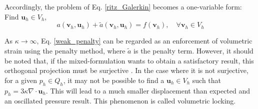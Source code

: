 Accordingly, the problem of Eq. \eqref{ritz_Galerkin} becomes a one-variable form:
Find $\boldsymbol{u}_h \in V_h$,
\begin{equation}\label{weak_penalty}
a(\boldsymbol{v}_h, \boldsymbol{u}_h) + \tilde{a}(\boldsymbol{v}_h, \boldsymbol{u}_h) = f(\boldsymbol{v}_h), \quad \forall \boldsymbol{v}_h \in V_h
\end{equation}

As $\kappa \rightarrow \infty$, Eq. \eqref{weak_penalty} can be regarded as an enforcement of volumetric strain using the penalty method, where $\tilde{a}$ is the penalty term. However, it should be noted that, if the mixed-formulation wants to obtain a satisfactory result, this orthogonal projection must be surjective \cite{stein2004}. In the case where it is not surjective, for a given $p_h \in Q_h$, it may not be possible to find a $\boldsymbol{u}_h \in V_h$ such that $p_h = 3\kappa \nabla \cdot \boldsymbol{u}_h$. This will lead to a much smaller displacement than expected and an oscillated pressure result. This phenomenon is called volumetric locking.